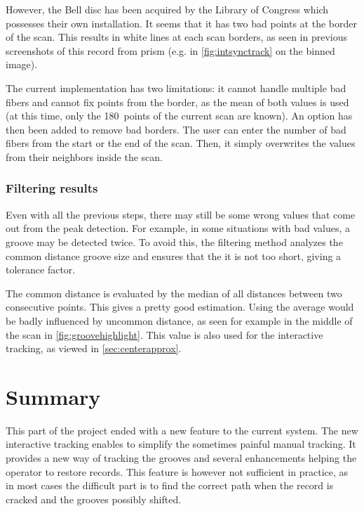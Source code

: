 However, the Bell disc has been acquired by the Library of Congress which possesses their own installation. It seems that it has two bad points at the border of the scan. This results in white lines at each scan borders, as seen in previous screenshots of this record from \gls{prism} (e.g. in \autoref{fig:intsynctrack} on the binned image).

The current implementation has two limitations: it cannot handle multiple bad fibers and cannot fix points from the border, as the mean of both values is used (at this time, only the 180~points of the current scan are known). An option has then been added to remove bad borders. The user can enter the number of bad fibers from the start or the end of the scan. Then, it simply overwrites the values from their neighbors inside the scan.

\subsubsection{Filtering results}
\label{sec:groovefilter}

Even with all the previous steps, there may still be some wrong values that come out from the peak detection. For example, in some situations with bad values, a groove may be detected twice. To avoid this, the filtering method analyzes the common distance groove size and ensures that the it is not too short, giving a tolerance factor.

The common distance is evaluated by the median of all distances between two consecutive points. This gives a pretty good estimation. Using the average would be badly influenced by uncommon distance, as seen for example in the middle of the scan in \autoref{fig:groovehighlight}. This value is also used for the interactive tracking, as viewed in \ref{sec:centerapprox}.

\section{Summary}

This part of the project ended with a new feature to the current system. The new interactive tracking enables to simplify the sometimes painful manual tracking. It provides a new way of tracking the grooves and several enhancements helping the operator to restore records. This feature is however not sufficient in practice, as in most cases the difficult part is to find the correct path when the record is cracked and the grooves possibly shifted.

